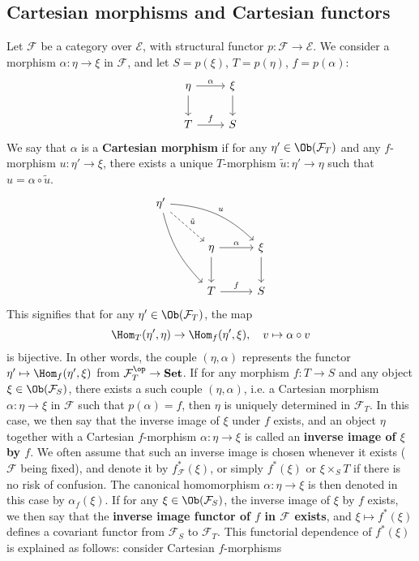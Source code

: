 \subsection{Cartesian morphisms and Cartesian functors}
Let $\mathcal{F}$ be a category over $\mathcal{E}$, with structural functor $p:\mathcal{F}\to \mathcal{E}$. We consider a morphism $\alpha:\eta\to \xi$ in $\mathcal{F}$, and let $S=p(\xi)$, $T=p(\eta)$, $f=p(\alpha)$:
\begin{equation}\label{fiber cat Cartesian diagram-1}
\begin{tikzcd}
\eta\ar[d]\ar[r,"\alpha"]&\xi\ar[d]\\
T\ar[r,"f"]&S
\end{tikzcd}
\end{equation}
We say that $\alpha$ is a \textbf{Cartesian morphism} if for any $\eta'\in\Ob(\mathcal{F}_T)$ and any $f$-morphism $u:\eta'\to \xi$, there exists a unique $T$-morphism $\tilde{u}:\eta'\to \eta$ such that $u=\alpha\circ\tilde{u}$.
\begin{equation}\label{fiber cat Cartesian diagram-2}
\begin{tikzcd}[row sep=8mm,column sep=10mm]
\eta'\ar[rdd,bend right=15pt]\ar[rd,dashed,"\tilde{u}"]\ar[rrd,"u",bend left=20pt]\\
&\eta\ar[r,"\alpha"]\ar[d]&\xi\ar[d]\\
&T\ar[r,"f"]&S
\end{tikzcd}
\end{equation}
This signifies that for any $\eta'\in\Ob(\mathcal{F}_T)$, the map
\begin{equation}\label{fiber cat Cartesian morphism represent Hom}
\Hom_T(\eta',\eta)\to \Hom_f(\eta',\xi),\quad v\mapsto\alpha\circ v
\end{equation}
is bijective. In other words, the couple $(\eta,\alpha)$ represents the functor $\eta'\mapsto\Hom_f(\eta',\xi)$ from $\mathcal{F}_T^{\op}\to \mathbf{Set}$. If for any morphism $f:T\to S$ and any object $\xi\in\Ob(\mathcal{F}_S)$, there exists a such couple $(\eta,\alpha)$, i.e. a Cartesian morphism $\alpha:\eta\to \xi$ in $\mathcal{F}$ such that $p(\alpha)=f$, then $\eta$ is uniquely determined in $\mathcal{F}_T$. In this case, we then say that the inverse image of $\xi$ under $f$ exists, and an object $\eta$ together with a Cartesian $f$-morphism $\alpha:\eta\to \xi$ is called an \textbf{inverse image of $\xi$ by $f$}. We often assume that such an inverse image is chosen whenever it exists ($\mathcal{F}$ being fixed), and denote it by $f^*_\mathcal{F}(\xi)$, or simply $f^*(\xi)$ or $\xi\times_ST$ if there is no risk of confusion. The canonical homomorphism $\alpha:\eta\to \xi$ is then denoted in this case by $\alpha_f(\xi)$. If for any $\xi\in\Ob(\mathcal{F}_S)$, the inverse image of $\xi$ by $f$ exists, we then say that the \textbf{inverse image functor of $f$ in $\mathcal{F}$ exists}, and $\xi\mapsto f^*(\xi)$ defines a covariant functor from $\mathcal{F}_S$ to $\mathcal{F}_T$. This functorial dependence of $f^*(\xi)$ is explained as follows: consider Cartesian $f$-morphisms

